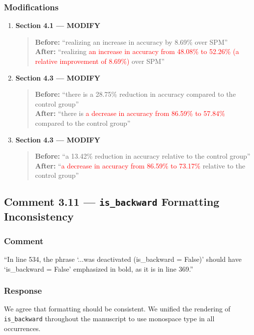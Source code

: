 \documentclass[11pt,a4paper]{article}
\begin{document}
\subsubsection{Modifications}
\begin{enumerate}
\item \textbf{Section 4.1 --- MODIFY}
\begin{quote}
\textbf{Before:} ``realizing an increase in accuracy by 8.69\% over SPM''\\[4pt]
\textbf{After:} ``realizing \textcolor{red}{an increase in accuracy from 48.08\% to 52.26\% (a relative improvement of 8.69\%)} over SPM''
\end{quote}

\item \textbf{Section 4.3 --- MODIFY}
\begin{quote}
\textbf{Before:} ``there is a 28.75\% reduction in accuracy compared to the control group''\\[4pt]
\textbf{After:} ``there is \textcolor{red}{a decrease in accuracy from 86.59\% to 57.84\%} compared to the control group''
\end{quote}

\item \textbf{Section 4.3 --- MODIFY}
\begin{quote}
\textbf{Before:} ``a 13.42\% reduction in accuracy relative to the control group''\\[4pt]
\textbf{After:} ``\textcolor{red}{a decrease in accuracy from 86.59\% to 73.17\%} relative to the control group''
\end{quote}
\end{enumerate}

\subsection{Comment 3.11 --- \texttt{is\_backward} Formatting Inconsistency}

\subsubsection{Comment}
``In line 534, the phrase `...was deactivated (is\_backward = False)' should have `is\_backward = False' emphasized in bold, as it is in line 369.''

\subsubsection{Response}
We agree that formatting should be consistent. We unified the rendering of \texttt{is\_backward} throughout the manuscript to use monospace type in all occurrences.
\end{document}
